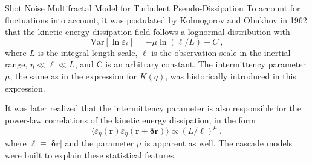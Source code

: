 \begin{chapter}{Shot Noise Multifractal Model for Turbulent Pseudo-Dissipation}
To account for fluctuations into account, it was postulated by Kolmogorov and Obu\-khov in 1962 that the kinetic energy dissipation field follows a lognormal distribution with
\begin{equation} \label{eq:kolmogorov-var}
    \mathrm{Var}[\ln \varepsilon_{\ell}] = - \mu \ln (\ell/L) + C \ ,
\end{equation}
where $L$ is the integral length scale, $\ell$ is the observation scale in the inertial range, $\eta \ll \ell \ll L$, and C is an arbitrary constant. The intermittency parameter $\mu$, the same as in the expression for $K(q)$, was historically introduced in this expression.

It was later realized \parencite{yaglom1966} that the intermittency parameter is also responsible for the power-law correlations of the kinetic energy dissipation, in the form
\begin{equation} \label{eq:gurvitch-corr}
\langle \varepsilon_{\eta}(\boldsymbol{r}) \varepsilon_{\eta}(\boldsymbol{r+\delta r}) \rangle \propto (L/\ell)^{\mu} \ ,
\end{equation}
where $\ell \equiv |\boldsymbol{\delta r}|$ and the parameter $\mu$ is apparent as well.
The cascade models were built to explain these statistical features.


\end{chapter}
